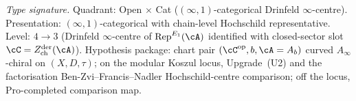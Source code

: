 \begin{theorem}
\label{thm:hdm-u-a-drinfeld-center}
\emph{Type signature.} Quadrant: Open $\times$ Cat
($(\infty,1)$-categorical Drinfeld $\infty$-centre).
Presentation: $(\infty,1)$-categorical with chain-level Hochschild
representative. Level: $4 \to 3$ (Drinfeld $\infty$-centre of
$\mathrm{Rep}^{E_1}(\cA)$ identified with closed-sector slot
$\cC = Z^{\mathrm{der}}_{\mathrm{ch}}(\cA)$). Hypothesis package:
chart pair $(\cC^{\mathrm{op}}, b, \cA = A_b)$ curved
$A_\infty$-chiral on $(X, D, \tau)$; on the modular Koszul locus,
Upgrade~\textup{(U2)} and the factorisation Ben-Zvi--Francis--Nadler
Hochschild-centre comparison; off the locus, $\mathrm{Pro}$-completed
comparison map.


\end{theorem}
